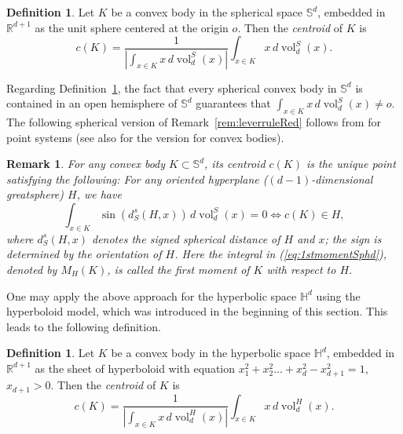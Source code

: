 \documentclass[twoside]{amsart}
\theoremstyle{plain}
\newtheorem{remark}[theorem]{Remark}
\theoremstyle{definition}
\newtheorem{definition}[theorem]{Definition}
\numberwithin{equation}{section}
\renewcommand{\Re}{\mathbb R}
\newcommand{\HHH}{\mathbb{H}}
\newcommand{\Sph}{\mathbb{S}}
\DeclareMathOperator{\vol}{vol}
\begin{document}
\begin{definition}\label{defn:centroidSphd}
Let $K$ be a convex body in the spherical space $\Sph^d$, embedded in $\Re^{d+1}$ as the unit sphere centered at the origin $o$. 
Then the \emph{centroid} of $K$ is
\begin{equation}\label{eq:centroidSphd}
c(K) = \frac{1}{|\int_{x \in K} x \, d \vol_d^S(x)|} \int_{x \in K} x \, d \vol_d^S(x).
\end{equation}
\end{definition}

Regarding Definition~\ref{defn:centroidSphd}, the fact that every spherical convex body in $\Sph^d$ is contained in an open hemisphere of $\Sph^d$ guarantees that $\int_{x \in K} x \, d \vol_d^S(x) \neq o$. The following spherical version of Remark~\ref{rem:leverruleRed} follows from \cite{Galperin} for point systems (see also \cite{BHLL} for the version for convex bodies).

\begin{remark}\label{rem:leverruleSphd}
For any convex body $K \subset \Sph^d$, its centroid $c(K)$ is the unique point satisfying the following:
For any oriented hyperplane ($(d-1)$-dimensional greatsphere) $H$, we have
\begin{equation}\label{eq:1stmomentSphd}
\int_{x \in K} \sin (d_S^s(H,x)) \, d \vol_d^S(x) = 0 \Longleftrightarrow c(K) \in H,
\end{equation}
where $d_S^s(H,x)$ denotes the signed spherical distance of $H$ and $x$; the sign is determined by the orientation of $H$. Here the integral in (\ref{eq:1stmomentSphd}), denoted by $M_H(K)$, is called the \emph{first moment} of $K$ with respect to $H$.
\end{remark}

One may apply the above approach for the hyperbolic space $\HHH^d$ using the hyperboloid model, which was introduced in the beginning of this section. This leads to the following definition.

\begin{definition}\label{defn:centroidHHd}
Let $K$ be a convex body in the hyperbolic space $\HHH^d$, embedded in $\Re^{d+1}$ as the sheet of hyperboloid with equation $x_1^2+x_2^2 \ldots + x_d^2 - x_{d+1}^2 = 1$, $x_{d+1} > 0$. Then the \emph{centroid} of $K$ is
\begin{equation}\label{eq:centroidHHd}
c(K) = \frac{1}{|\int_{x \in K} x \, d \vol_d^H(x)|} \int_{x \in K} x \, d \vol_d^H(x).
\end{equation}
\end{definition}
\end{document}
